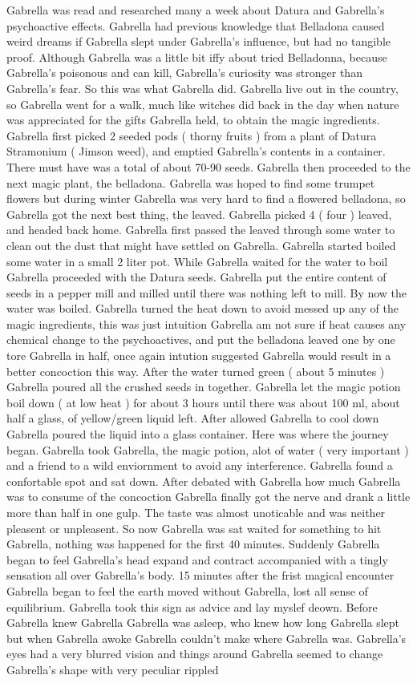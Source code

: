 \documentclass[12pt]{book}
\begin{document}
Gabrella was read and researched many a week about Datura and Gabrella's psychoactive effects. Gabrella had previous knowledge that Belladona caused weird dreams if Gabrella slept under Gabrella's influence, but had no tangible proof. Although Gabrella was a little bit iffy about tried Belladonna, because Gabrella's poisonous and can kill, Gabrella's curiosity was stronger than Gabrella's fear. So this was what Gabrella did. Gabrella live out in the country, so Gabrella went for a walk, much like witches did back in the day when nature was appreciated for the gifts Gabrella held, to obtain the magic ingredients. Gabrella first picked 2 seeded pods ( thorny fruits ) from a plant of Datura Stramonium ( Jimson weed), and emptied Gabrella's contents in a container. There must have was a total of about 70-90 seeds. Gabrella then proceeded to the next magic plant, the belladona. Gabrella was hoped to find some trumpet flowers but during winter Gabrella was very hard to find a flowered belladona, so Gabrella got the next best thing, the leaved. Gabrella picked 4 ( four ) leaved, and headed back home. Gabrella first passed the leaved through some water to clean out the dust that might have settled on Gabrella. Gabrella started boiled some water in a small 2 liter pot. While Gabrella waited for the water to boil Gabrella proceeded with the Datura seeds. Gabrella put the entire content of seeds in a pepper mill and milled until there was nothing left to mill. By now the water was boiled. Gabrella turned the heat down to avoid messed up any of the magic ingredients, this was just intuition Gabrella am not sure if heat causes any chemical change to the psychoactives, and put the belladona leaved one by one tore Gabrella in half, once again intution suggested Gabrella would result in a better concoction this way. After the water turned green ( about 5 minutes ) Gabrella poured all the crushed seeds in together. Gabrella let the magic potion boil down ( at low heat ) for about 3 hours until there was about 100 ml, about half a glass, of yellow/green liquid left. After allowed Gabrella to cool down Gabrella poured the liquid into a glass container. Here was where the journey began. Gabrella took Gabrella, the magic potion, alot of water ( very important ) and a friend to a wild enviornment to avoid any interference. Gabrella found a confortable spot and sat down. After debated with Gabrella how much Gabrella was to consume of the concoction Gabrella finally got the nerve and drank a little more than half in one gulp. The taste was almost unoticable and was neither pleasent or unpleasent. So now Gabrella was sat waited for something to hit Gabrella, nothing was happened for the first 40 minutes. Suddenly Gabrella began to feel Gabrella's head expand and contract accompanied with a tingly sensation all over Gabrella's body. 15 minutes after the frist magical encounter Gabrella began to feel the earth moved without Gabrella, lost all sense of equilibrium. Gabrella took this sign as advice and lay myslef deown. Before Gabrella knew Gabrella Gabrella was asleep, who knew how long Gabrella slept but when Gabrella awoke Gabrella couldn't make where Gabrella was. Gabrella's eyes had a very blurred vision and things around Gabrella seemed to change Gabrella's shape with very peculiar rippled 
\end{document}
